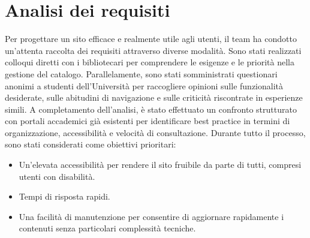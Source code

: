\documentclass{article}
\begin{document}
\section{Analisi dei requisiti}
Per progettare un sito efficace e realmente utile agli utenti, il team ha condotto un'attenta raccolta dei requisiti attraverso diverse modalità. Sono stati realizzati colloqui diretti con i bibliotecari per comprendere le esigenze e le priorità nella gestione del catalogo. Parallelamente, sono stati somministrati questionari anonimi a studenti dell'Università per raccogliere opinioni sulle funzionalità desiderate, sulle abitudini di navigazione e sulle criticità riscontrate in esperienze simili.
A completamento dell'analisi, è stato effettuato un confronto strutturato con portali accademici già esistenti per identificare best practice in termini di organizzazione, accessibilità e velocità di consultazione.
Durante tutto il processo, sono stati considerati come obiettivi prioritari:

\begin{itemize}
    \item Un'elevata accessibilità per rendere il sito fruibile da parte di tutti, compresi utenti con disabilità.
    \item Tempi di risposta rapidi.
    \item Una facilità di manutenzione per consentire di aggiornare rapidamente i contenuti senza particolari complessità tecniche.
\end{itemize}
\end{document}
